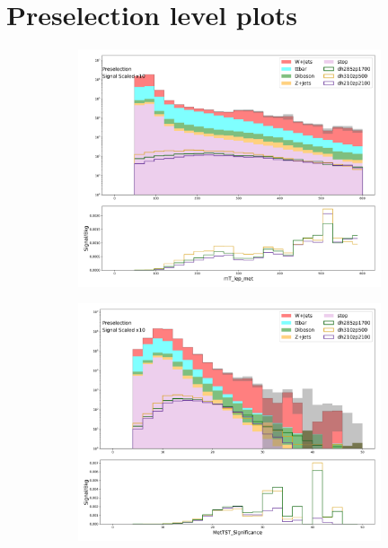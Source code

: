 \label{chapter:appendix}

\section{Preselection level plots}
\label{section:preselection}
\begin{figure}[htbp]
  \centering

     \begin{subfigure}{0.49\textwidth}
     \includegraphics[width = 0.98\textwidth]{Figures/appendix/Preselection/mT_lep_met.png}
     \caption{\mtlepmet}
     \end{subfigure}
     \begin{subfigure}{0.49\textwidth}
     \includegraphics[width = 0.98\textwidth]{Figures/appendix/Preselection/MetTST_Significance.png}

\end{subfigure}
\end{figure}
